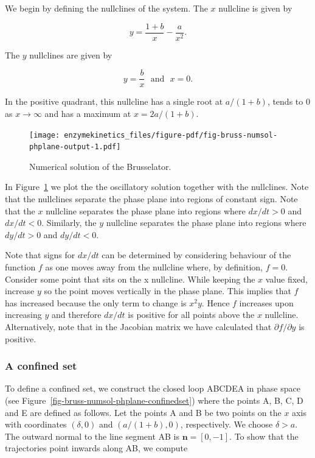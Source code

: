 \documentclass[
  letterpaper,
  DIV=11,
  numbers=noendperiod]{scrreprt}
\begin{document}
We begin by defining the nullclines of the system. The \(x\) nullcline
is given by

\[
y=\frac{1+b}{x}-\frac{a}{x^2}.
\]

The \(y\) nullclines are given by

\[
y=\frac{b}{x} \ \ \ \textrm{and} \ \ \ x=0.
\]

In the positive quadrant, this nullcline has a single root at
\(a/(1+b)\), tends to 0 as \(x\rightarrow \infty\) and has a maximum at
\(x=2a/(1+b)\).

\begin{figure}

{\centering \texttt{[image: enzymekinetics\_files/figure-pdf/fig-bruss-numsol-phplane-output-1.pdf]}

}

\caption{\label{fig-bruss-numsol-phplane}Numerical solution of the
Brusselator.}

\end{figure}

In Figure~\ref{fig-bruss-numsol-phplane} we plot the the oscillatory
solution together with the nullclines. Note that the nullclines separate
the phase plane into regions of constant sign. Note that the \(x\)
nullcline separates the phase plane into regions where \(dx/dt>0\) and
\(dx/dt<0\). Similarly, the \(y\) nullcline separates the phase plane
into regions where \(dy/dt>0\) and \(dy/dt<0\).

Note that signs for \(dx/dt\) can be determined by considering behaviour
of the function \(f\) as one moves away from the nullcline where, by
definition, \(f=0\). Consider some point that sits on the x nullcline.
While keeping the \(x\) value fixed, increase \(y\) so the point moves
vertically in the phase plane. This implies that \(f\) has increased
because the only term to change is \(x^2y\). Hence \(f\) increases upon
increasing \(y\) and therefore \(dx/dt\) is positive for all points
above the \(x\) nullcline. Alternatively, note that in the Jacobian
matrix we have calculated that \(\partial f/\partial y\) is positive.

\hypertarget{a-confined-set}{%
\subsubsection{A confined set}\label{a-confined-set}}

To define a confined set, we construct the closed loop ABCDEA in phase
space (see Figure~\ref{fig-bruss-numsol-phplane-confinedset}) where the
points A, B, C, D and E are defined as follows. Let the points A and B
be two points on the \(x\) axis with coordinates \((\delta,0)\) and
\((a/(1+b),0)\), respectively. We choose \(\delta>a\). The outward
normal to the line segment AB is \(\mathbf{n}=[0,-1]\). To show that the
trajectories point inwards along AB, we compute
\end{document}
